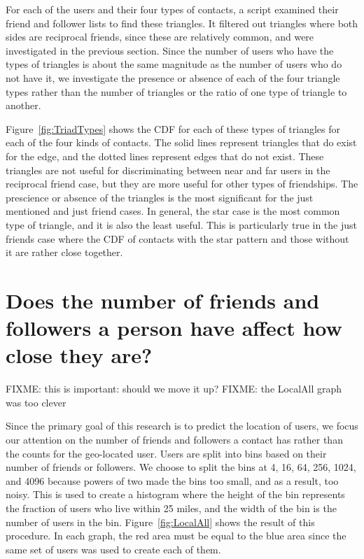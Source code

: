 For each of the users and their four types of contacts, a script examined their
friend and follower lists to find these triangles.
It filtered out triangles where both sides are reciprocal friends, since these
are relatively common, and were investigated in the previous section.
Since the number of users who have the types of triangles is about the same
magnitude as the number of users who do not have it, we investigate the
presence or absence of each of the four triangle types rather than the number
of triangles or the ratio of one type of triangle to another.

Figure~\ref{fig:TriadTypes} shows the CDF for each of these types of triangles
for each of the four kinds of contacts.
The solid lines represent triangles that do exist for the edge, and the dotted
lines represent edges that do not exist.
These triangles are not useful for discriminating between near and far users in
the reciprocal friend case, but they are more useful for other types of
friendships.
The prescience or absence of the triangles is the most significant for the just
mentioned and just friend cases.
In general, the star case is the most common type of triangle, and it is also
the least useful.
This is particularly true in the just friends case where the CDF of contacts
with the star pattern and those without it are rather close together.

\section{Does the number of friends and followers a person have affect how
close they are?}

FIXME: this is important: should we move it up?
FIXME: the LocalAll graph was too clever

Since the primary goal of this research is to predict the location of users, we
focus our attention on the number of friends and followers a contact has rather
than the counts for the geo-located user.
Users are split into bins based on their number of friends or followers.
We choose to split the bins at 4, 16, 64, 256, 1024, and 4096 because powers
of two made the bins too small, and as a result, too noisy.
This is used to create a histogram where the height of the bin represents the
fraction of users who live within 25 miles, and the width of the bin is the
number of users in the bin.
Figure~\ref{fig:LocalAll} shows the result of this procedure.
In each graph, the red area must be equal to the blue area since the same set
of users was used to create each of them.

